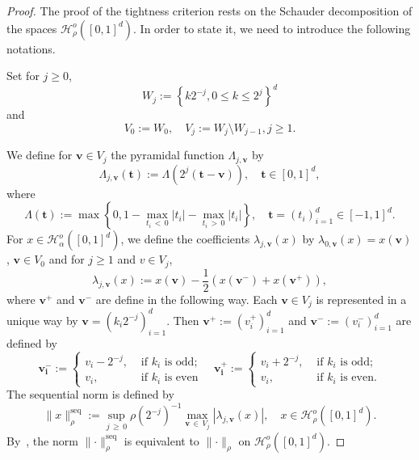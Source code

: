 \documentclass[10pt]{amsart}
\theoremstyle{definition}\newtheorem{defi}[theo]{Definition}\newtheorem{rema}[theo]{Remark}\newtheorem{exam}[theo]{Example}\newtheorem{exem}[theo]{Example}\newtheorem{nota}[theo]{Notation}
\newcommand{\clH}{\mathcal{H}}
\newcommand{\seq}{\mathrm{seq}}
\newcommand\abs[1]{|#1|}
\newcommand{\norm}[1]{\lVert #1\rVert}
\newcommand{\gr}[1]{\bm{#1}}
\begin{document}
\begin{proof}
The proof of the tightness criterion rests on the Schauder decomposition of the spaces $\clH_\rho^o\left([0,1]^d\right)$. In order to state it, we need to introduce the following notations.

Set for $j\geqslant 0$,
\begin{equation}
W_j:=\left\{k2^{-j},0\leq k\leq 2^j\right\}^d
\end{equation}
and
\begin{equation}
V_0:=W_0, \quad V_j:=W_j\setminus W_{j-1},j\geqslant 1.
\end{equation}

We define for $\gr{v}\in V_j$ the pyramidal function $\Lambda_{j,
\gr{v}}$ by
\begin{equation}
\Lambda_{j,\gr{v}}(\gr{t}):=\Lambda\left(2^j(\gr{t}-\gr{v})\right), \quad
\gr{t}\in [0,1]^d,
\end{equation}
where
\begin{equation}
\Lambda(\gr{t}):=\max\left\{0,1-\max_{t_i\,<\,0}\abs{t_i}-\max_{t_i\,>\,0}\abs{t_i}\right\},
\quad \gr{t}=(t_i)_{i=1}^d\in [-1,1]^d.
\end{equation}
For $x\in \clH_\alpha^o([0,1]^d)$, we define the coefficients $\lambda_{j,\gr{v}}(x)$ by $\lambda_{0,\gr{v}}(x)=x(\gr{v})$, $\gr{v}\in V_0$ and for $j\geqslant 1$ and $v\in V_j$,
\begin{equation}
\lambda_{j,\gr{v}}(x):=x\left(\gr{v}\right)-\frac 12\left(x\left(\gr{v^-}\right)+ x\left(\gr{v^+}\right)\right),
\end{equation}
where $\gr{v^+}$ and $\gr{v^-}$ are define in the following way. Each $\gr{v}\in V_j$ is represented in a unique way by $\gr{v}=
(k_i2^{-j})_{i=1}^d$. Then $\gr{v^+}:=(v^+_i)_{i=1}^d$ and $\gr{v^-}:=(v^-_i)_{i=1}^d$ are defined by
\begin{equation}
\gr{v_i^-}:=
\begin{cases}
v_i-2^{-j},&\text{ if }k_i\text{ is odd;}\\
v_i,&\text{ if }k_i\text{ is even}
\end{cases}\quad
\gr{v_i^+}:=
\begin{cases}
v_i+2^{-j},&\text{ if }k_i\text{ is odd;}\\
v_i,&\text{ if }k_i\text{ is even.}
\end{cases}
\end{equation}
The sequential norm is defined by
\begin{equation}
\norm{x}_\rho^{\seq}:=
\sup_{j\,\geqslant\,0}\rho\left(2^{-j}\right)^{-1}\max_{\gr{v}\,\in\,V_j}
\left|\lambda_{j,\gr{v}}(x)\right|, \quad x\in \clH_\rho^o\left([0,1]^d\right).
\end{equation}
By~\cite{MR2141332}, the norm $\norm{\cdot}_\rho^{\seq}$ is equivalent to $\norm{\cdot}_\rho$ on $\clH_\rho^o([0,1]^d)$.


\end{proof}
\end{document}
